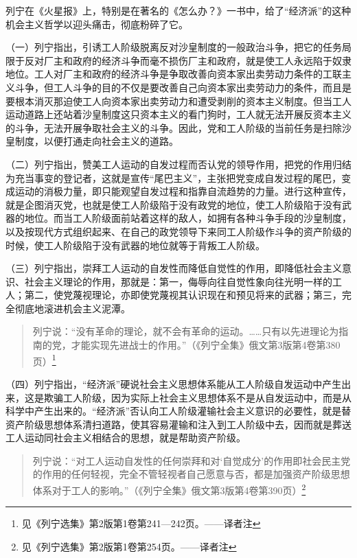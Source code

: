 列宁在《火星报》上，特别是在著名的《怎么办？》一书中，给了“经济派”的这种机会主义哲学以迎头痛击，彻底粉碎了它。

（一）列宁指出，引诱工人阶级脱离反对沙皇制度的一般政治斗争，把它的任务局限于反对厂主和政府的经济斗争而毫不损伤厂主和政府，就是使工人永远陷于奴隶地位。工人对厂主和政府的经济斗争是争取改善向资本家出卖劳动力条件的工联主义斗争，但工人斗争的目的不仅是要改善自己向资本家出卖劳动力的条件，而且是要根本消灭那迫使工人向资本家出卖劳动力和遭受剥削的资本主义制度。但当工人运动道路上还站着沙皇制度这只资本主义的看门狗时，工人就无法开展反资本主义的斗争，无法开展争取社会主义的斗争。因此，党和工人阶级的当前任务是扫除沙皇制度，以便打通走向社会主义的道路。

（二）列宁指出，赞美工人运动的自发过程而否认党的领导作用，把党的作用归结为充当事变的登记者，这就是宣传“尾巴主义”，主张把党变成自发过程的尾巴，变成运动的消极力量，即只能观望自发过程和指靠自流趋势的力量。进行这种宣传，就是企图消灭党，也就是使工人阶级陷于没有政党的地位，使工人阶级陷于没有武器的地位。而当工人阶级面前站着这样的敌人，如拥有各种斗争手段的沙皇制度，以及按现代方式组织起来、在自己的政党领导下来同工人阶级作斗争的资产阶级的时候，使工人阶级陷于没有武器的地位就等于背叛工人阶级。

（三）列宁指出，崇拜工人运动的自发性而降低自觉性的作用，即降低社会主义意识、社会主义理论的作用，那就是：第一，侮辱向往自觉性象向往光明一样的工人；第二，使党蔑视理论，亦即使党蔑视其认识现在和预见将来的武器；第三，完全彻底地滚进机会主义泥潭。

\begin{quotation}
列宁说：“没有革命的理论，就不会有革命的运动。……只有以先进理论为指南的党，才能实现先进战士的作用。”（《列宁全集》俄文第3版第4卷第380页）\footnote{见《列宁选集》第2版第1卷第241—242页。——译者注}
\end{quotation}

（四）列宁指出，“经济派”硬说社会主义思想体系能从工人阶级自发运动中产生出来，这是欺骗工人阶级，因为实际上社会主义思想体系不是从自发运动中，而是从科学中产生出来的。“经济派”否认向工人阶级灌输社会主义意识的必要性，就是替资产阶级思想体系清扫道路，使其容易灌输和注入到工人阶级中去，因而就是葬送工人运动同社会主义相结合的思想，就是帮助资产阶级。

\begin{quotation}
列宁说：“对工人运动自发性的任何崇拜和对‘自觉成分’的作用即社会民主党的作用的任何轻视，完全不管轻视者自己愿意与否，都是加强资产阶级思想体系对于工人的影响。”（《列宁全集》俄文第3版第4卷第390页）\footnote{见《列宁选集》第2版第1卷第254页。——译者注}
\end{quotation}

